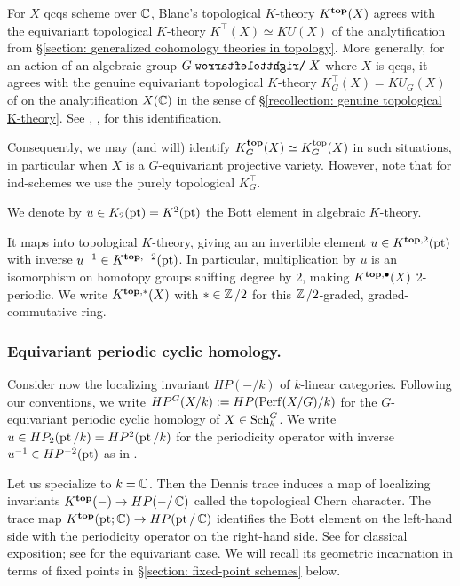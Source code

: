 \begin{remark}
For $X$ qcqs scheme over $\operatorname{\mathbb{C}}$, Blanc's topological $K$-theory $K^{\mathbf{top}}(X)$ agrees with the equivariant topological $K$-theory $K^{\top}(X) \simeq KU(X)$ of the analytification from \S \ref{section: generalized cohomology theories in topology}. More generally, for an action of an algebraic group $G \acts X$ where $X$ is qcqs, it agrees with the genuine equivariant topological $K$-theory $K^{\top}_G(X) = KU_G(X)$ of on the analytification $X(\operatorname{\mathbb{C}})$ in the sense of \S \ref{recollection: genuine topological K-theory}. See \cite{Bla16}, \cite{HLP20}, \cite[Remark 2.27]{Low25} for this identification.

Consequently, we may (and will) identify $K^{\mathbf{top}}_G(X) \simeq K^{\mathrm{top}}_G(X)$ in such situations, in particular when $X$ is a $G$-equivariant projective variety. However, note that for ind-schemes we use the purely topological $K^{\top}_G$.
\end{remark}


\begin{notation}
We denote by $u \in K_{2}(\operatorname{pt}) = K^{2}(\operatorname{pt})$ the Bott element in algebraic $K$-theory. 

It maps into topological $K$-theory, giving an an invertible element $u \in K^{\mathbf{top}, 2}(\operatorname{pt})$ with inverse $u^{-1} \in K^{\mathbf{top}, -2}(\operatorname{pt})$. In particular, multiplication by $u$ is an isomorphism on homotopy groups shifting degree by $2$, making $K^{\mathbf{top}, \bullet}(X)$ 2-periodic. We write $K^{\mathbf{top}, *}(X)$ with $* \in \operatorname{\mathbb{Z}}/2$ for this $\operatorname{\mathbb{Z}}/2$-graded, graded-commutative ring.
\end{notation}



\subsubsection{Equivariant periodic cyclic homology.}
Consider now the localizing invariant $HP(-/k)$ of $k$-linear categories. Following our conventions, we write $HP^G(X / k) := HP(\operatorname{Perf}(X/G) / k)$ for the $G$-equivariant periodic cyclic homology of $X \in \operatorname{Sch}^G_{k}$. 
We write $u \in HP_{2}(\operatorname{pt} / k) = HP^{2}(\operatorname{pt} / k)$ for the periodicity operator with inverse $u^{-1} \in HP^{-2}(\operatorname{pt})$ as in \cite[\S 5.1.4]{Lod97}.

Let us specialize to $k=\operatorname{\mathbb{C}}$. Then the Dennis trace induces a map of localizing invariants $K^{\mathbf{top}}(-) \to HP(- / \operatorname{\mathbb{C}})$ called the topological Chern character. The trace map $K^{\mathbf{top}}(\operatorname{pt}; \operatorname{\mathbb{C}}) \to HP(\operatorname{pt} / \operatorname{\mathbb{C}})$ identifies the Bott element on the left-hand side with the periodicity operator on the right-hand side. See \cite{Lod97} for classical exposition; see \cite{Chen20, EKS25} for the equivariant case. We will recall its geometric incarnation in terms of fixed points in \S \ref{section: fixed-point schemes} below.


